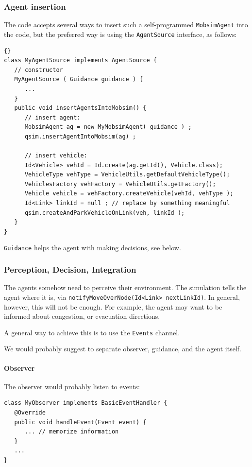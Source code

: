 \subsubsection{Agent insertion}

The code accepts several ways to insert such a self-programmed \lstinline$MobsimAgent$ into the code, but the preferred way is using the \lstinline$AgentSource$ interface, as follows:
\begin{lstlisting}[basicstyle=\footnotesize\tt]{}
class MyAgentSource implements AgentSource {
   // constructor
   MyAgentSource ( Guidance guidance ) {
      ...
   }
   public void insertAgentsIntoMobsim() {
      // insert agent:
      MobsimAgent ag = new MyMobsimAgent( guidance ) ;
      qsim.insertAgentIntoMobsim(ag) ;
        
      // insert vehicle:
      Id<Vehicle> vehId = Id.create(ag.getId(), Vehicle.class);
      VehicleType vehType = VehicleUtils.getDefaultVehicleType();
      VehiclesFactory vehFactory = VehicleUtils.getFactory();
      Vehicle vehicle = vehFactory.createVehicle(vehId, vehType );
      Id<Link> linkId = null ; // replace by something meaningful
      qsim.createAndParkVehicleOnLink(veh, linkId );
   }
}
\end{lstlisting}
\lstinline$Guidance$ helps the agent with making decisions, see below.

\subsubsection{Perception, Decision, Integration}

The agents somehow need to perceive their environment.  The simulation tells the agent where it is, via \lstinline$notifyMoveOverNode(Id<Link> nextLinkId)$.  In general, however, this will not be enough.  For example, the agent may want to be informed about congestion, or evacuation directions.

A general way to achieve this is to use the \lstinline$Events$ channel.

We would probably suggest to separate observer, guidance, and the agent itself.

\paragraph{Observer}

The observer would probably listen to events:
\begin{lstlisting}
class MyObserver implements BasicEventHandler {
   @Override
   public void handleEvent(Event event) {
      ... // memorize information
   }
   ...
}
\end{lstlisting}

